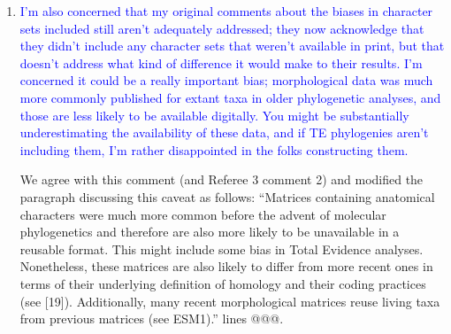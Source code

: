 \documentclass[12pt,letterpaper]{article}
\begin{document}
\begin{enumerate}

\item{\textcolor{blue}{I'm also concerned that my original comments about the biases in character sets included still aren't adequately addressed; they now acknowledge that they didn't include any character sets that weren't available in print, but that doesn't address what kind of difference it would make to their results. I'm concerned it could be a really important bias; morphological data was much more commonly published for extant taxa in older phylogenetic analyses, and those are less likely to be available digitally. You might be substantially underestimating the availability of these data, and if TE phylogenies aren't including them, I'm rather disappointed in the folks constructing them. }}

We agree with this comment (and Referee 3 comment 2) and modified the paragraph discussing this caveat as follows:
``Matrices containing anatomical characters were much more common before the advent of molecular phylogenetics and therefore are also more likely to be unavailable in a reusable format.
This might include some bias in Total Evidence analyses.
Nonetheless, these matrices are also likely to differ from more recent ones in terms of their underlying definition of homology and their coding practices (see [19]).
Additionally, many recent morphological matrices reuse living taxa from previous matrices (see ESM1).''
lines @@@.





\end{enumerate}
\end{document}

